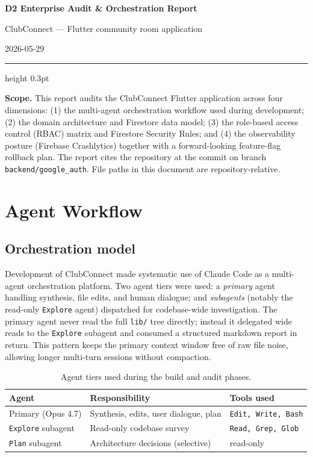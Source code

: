 \documentclass[11pt,a4paper]{article}
\begin{document}
\thispagestyle{fancy}

\begingroup
\centering
{\LARGE\bfseries D2 Enterprise Audit \& Orchestration Report\par}
\vspace{2pt}
{\large ClubConnect --- Flutter community room application\par}
\vspace{2pt}
{\small 2026-05-29\par}
\endgroup
\vspace{4pt}
\hrule height 0.3pt
\vspace{6pt}

\noindent\textbf{Scope.} This report audits the ClubConnect Flutter application across four
dimensions: (1) the multi-agent orchestration workflow used during development;
(2) the domain architecture and Firestore data model; (3) the role-based access
control (RBAC) matrix and Firestore Security Rules; and (4) the observability
posture (Firebase Crashlytics) together with a forward-looking feature-flag
rollback plan. The report cites the repository at the commit on branch
\texttt{backend/google\_auth}. File paths in this document are repository-relative.

\section{Agent Workflow}
\label{sec:agent}

\subsection{Orchestration model}

Development of ClubConnect made systematic use of Claude Code as a multi-agent
orchestration platform. Two agent tiers were used: a \emph{primary} agent
handling synthesis, file edits, and human dialogue; and \emph{subagents}
(notably the read-only \texttt{Explore} agent) dispatched for codebase-wide
investigation. The primary agent never read the full \texttt{lib/} tree
directly; instead it delegated wide reads to the \texttt{Explore} subagent and
consumed a structured markdown report in return. This pattern keeps the primary
context window free of raw file noise, allowing longer multi-turn sessions
without compaction.

\begin{table}[h]
\centering\small
\begin{tabularx}{\linewidth}{@{}lXl@{}}
\toprule
\textbf{Agent} & \textbf{Responsibility} & \textbf{Tools used} \\
\midrule
Primary (Opus 4.7) & Synthesis, edits, user dialogue, plan & \texttt{Edit, Write, Bash} \\
\texttt{Explore} subagent & Read-only codebase survey & \texttt{Read, Grep, Glob} \\
\texttt{Plan} subagent & Architecture decisions (selective) & read-only \\
\bottomrule
\end{tabularx}
\caption{Agent tiers used during the build and audit phases.}
\end{table}
\end{document}
